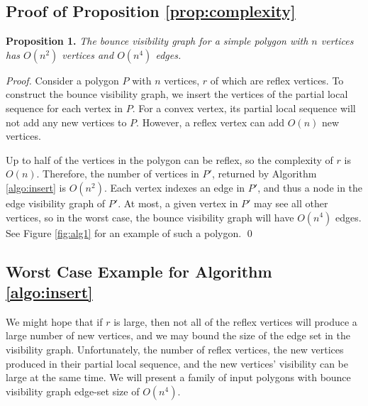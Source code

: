 \documentclass[]{styles/svproc}  %
\begin{document}
\begin{appendix}


\section{Proof of Proposition \ref{prop:complexity}}


\textbf{Proposition 1.} {\em The bounce visibility graph for a simple polygon with $n$ vertices has 
$O(n^2)$ vertices and $O(n^4)$ edges.}

\begin{proof}

Consider a polygon $P$ with $n$ vertices, $r$ of which are reflex vertices. To
construct the bounce visibility graph, we insert the vertices of the partial
local sequence for each vertex in $P$. For a convex vertex, its partial local sequence 
will not add any new vertices to $P$. However, a reflex vertex can add $O(n)$ new vertices. 

Up to half of the vertices in the polygon can be reflex, so the complexity of
$r$ is $O(n)$. Therefore, the number of vertices in $P'$, returned by Algorithm
\ref{algo:insert} is $O(n^2)$. Each vertex indexes an edge in $P'$, and
thus a node in the edge visibility graph of $P'$. At most, a given vertex in $P'$ may see all other vertices, so in the worst
case, the bounce visibility graph will have $O(n^4)$ edges. See Figure
\ref{fig:alg1} for an example of such a polygon. \qed

\end{proof}

\subsection{Worst Case Example for Algorithm \ref{algo:insert}}

We might hope that if $r$ is large, then not all of the reflex vertices will
produce a large number of new vertices, and we may bound the size of the edge
set in the visibility graph. Unfortunately, the number of reflex
vertices, the new vertices produced in their partial local sequence, and the new
vertices' visibility can be large at the same time. We will present a family of
input polygons with bounce visibility graph edge-set size of $O(n^4)$.


\end{appendix}
\end{document}
